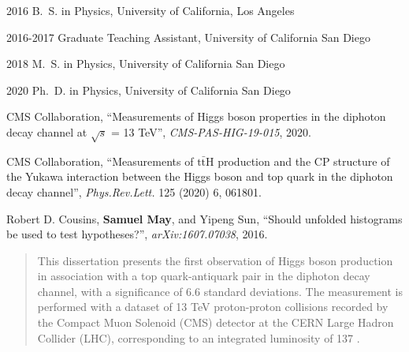 \begin{frontmatter}
%
%
\begin{vitapage}
\begin{vita}
  \item[2016] B.~S. in Physics, University of California, Los Angeles
  \item[2016-2017] Graduate Teaching Assistant, University of California San Diego
  \item[2018] M.~S. in Physics, University of California San Diego
  \item[2020] Ph.~D. in Physics, University of California San Diego
\end{vita}
\begin{publications}
  \item CMS Collaboration, ``Measurements of Higgs boson properties in the diphoton decay channel at $\sqrt{s}$ = 13 TeV'', \emph{CMS-PAS-HIG-19-015}, 2020.
  \item CMS Collaboration, ``Measurements of $\mathrm{t\bar{t}}$H production and the CP structure of the Yukawa interaction between the Higgs boson and top quark in the diphoton decay channel'', \emph{Phys.Rev.Lett.} 125 (2020) 6, 061801.
  \item Robert D. Cousins, \textbf{Samuel May}, and Yipeng Sun, ``Should unfolded histograms be used to test hypotheses?'', \emph{arXiv:1607.07038}, 2016.
\end{publications}
\end{vitapage}


%
%
\begin{abstract}
  This dissertation presents the first observation of Higgs boson production in association with a top quark-antiquark pair in the diphoton decay channel, with a significance of 6.6 standard deviations.
  The measurement is performed with a dataset of 13 TeV proton-proton collisions recorded by the Compact Muon Solenoid (CMS) detector at the CERN Large Hadron Collider (LHC), corresponding to an integrated luminosity of 137 \fbinv.

\end{abstract}


\end{frontmatter}
